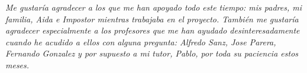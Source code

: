 \emph{Me gustaría agradecer a los que me han apoyado todo este tiempo: mis padres, mi familia, Aida e Impostor mientras trabajaba en el proyecto. También me gustaría agradecer especialmente a los profesores que me han ayudado desinteresadamente cuando he acudido a ellos con alguna pregunta: Alfredo Sanz, Jose Parera, Fernando Gonzalez y por supuesto a mi tutor, Pablo, por toda su paciencia estos meses.}